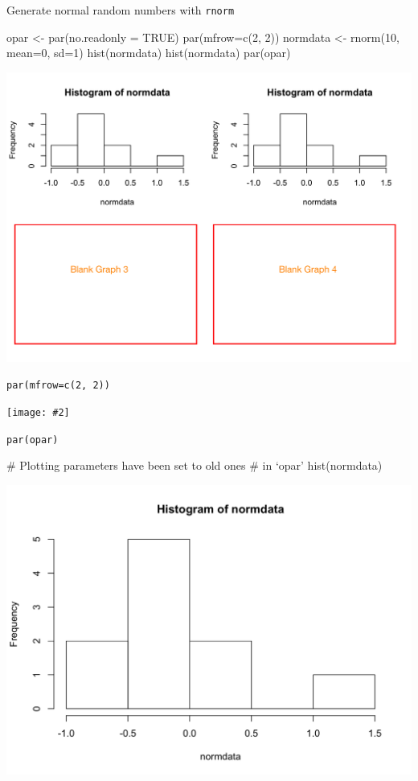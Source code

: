 \documentclass[12pt, t, xcolor=dvipsnames]{beamer}
\newcommand{\code}[1]{\colorbox{codegray}{\textcolor{black!95}{\texttt{#1}}}}
\newcommand {\framedgraphic}[2] {
    \begin{frame}{#1}
        \begin{center}
            \texttt{[image: \#2]}
        \end{center}
    \end{frame}
}
\begin{document}
\begin{frame}[fragile]{Generate normal random numbers with \code{rnorm}}
\begin{Rcode}
opar <- par(no.readonly = TRUE)
par(mfrow=c(2, 2)) 
normdata <- rnorm(10, mean=0, sd=1) 
hist(normdata)
hist(normdata)
par(opar)
\end{Rcode}

\includegraphics[width=\linewidth, height=0.5\textheight, keepaspectratio]{his22}
\end{frame}

\framedgraphic{\code{par(mfrow=c(2, 2))}}{his22}

\begin{frame}[fragile]{\code{par(opar)}}
\begin{Rcode}
# Plotting parameters have been set to old ones
# in `opar'
hist(normdata)
\end{Rcode}
\includegraphics[height=0.6\textheight, keepaspectratio]{his11}
\end{frame}
\end{document}
